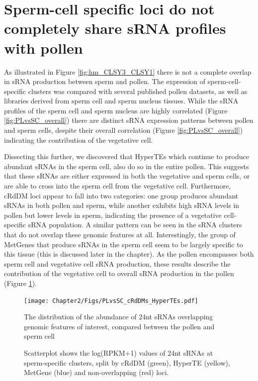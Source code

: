 \section{Sperm-cell specific loci do not completely share sRNA profiles with pollen}

As illustrated in Figure \ref{fig:hm_CLSY3_CLSY1} there is not a complete overlap in sRNA production between sperm and pollen. The expression of sperm-cell-specific clusters was compared with several published pollen datasets, as well as libraries derived from sperm cell and sperm nucleus tissues. While the sRNA profiles of the sperm cell and sperm nucleus are highly correlated (Figure \ref{fig:PLvsSC_overall}) there are distinct sRNA expression patterns between pollen and sperm cells, despite their overall correlation (Figure \ref{fig:PLvsSC_overall}) indicating the contribution of the vegetative cell. 

Dissecting this further, we discovered that HyperTEs which continue to produce abundant sRNAs in the sperm cell, also do so in the entire pollen.  This suggests that these sRNAs are either expressed in both the vegetative and sperm cells, or are able to cross into the sperm cell from the vegetative cell. Furthermore, cRdDM loci appear to fall into two categories: one group produces abundant sRNAs in both pollen and sperm, while another exhibits high sRNA levels in pollen but lower levels in sperm, indicating the presence of a vegetative cell-specific sRNA population. A similar pattern can be seen in the sRNA clusters that do not overlap these genomic features at all. Interestingly, the group of MetGenes that produce sRNAs in the sperm cell seem to be  largely specific to this tissue (this is discussed later in the chapter). As the pollen encompasses both sperm cell and vegetative cell sRNA production, these results describe the contribution of the vegetative cell to overall sRNA production in the pollen (Figure \ref{fig:PLvSC_cRdDMs}).

\begin{figure}[htbp!] 
\centering    
    \texttt{[image: Chapter2/Figs/PLvsSC\_cRdDMs\_HyperTEs.pdf]}
\caption{The distribution of the abundance of 24nt sRNAs overlapping genomic features of interest, compared between the pollen and sperm cell}
\label{fig:PLvSC_cRdDMs}
\captionsetup{font=small}
    \caption*{Scatterplot shows the log(RPKM+1) values of 24nt sRNAs at sperm-specific clusters, split by cRdDM (green), HyperTE (yellow), MetGene (blue) and non-overlapping (red) loci.}
\end{figure}

